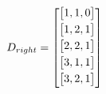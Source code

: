 \documentclass{article}
\begin{document}
\begin{center}
\begin{minipage}{0.2\textwidth}
            $$D_{right} = 
        \begin{bmatrix}
        \vspace{1mm}
        \begin{bmatrix}
         1,1,0 \\ 
         \end{bmatrix} \\
        \vspace{1mm}
         \begin{bmatrix}
         1,2,1 \\ 
         \end{bmatrix} \\
        \vspace{1mm}
         \begin{bmatrix}
         2,2,1 \\ 
         \end{bmatrix} \\
        \vspace{1mm}
         \begin{bmatrix}
         3,1,1 \\
         \end{bmatrix} \\
        \vspace{1mm}
         \begin{bmatrix}
         3,2,1 \\
        \end{bmatrix} \\
         \end{bmatrix}
        $$
\end{minipage}\quad
\end{center}
\end{document}
